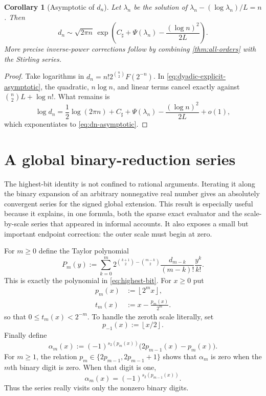 \documentclass[11pt]{article}
\numberwithin{equation}{section}
\newtheorem{corollary}[theorem]{Corollary}
\theoremstyle{definition}
\theoremstyle{remark}
\newcommand{\floor}[1]{\left\lfloor#1\right\rfloor}
\begin{document}
\begin{corollary}[Asymptotic of $d_n$]\label{cor:dn-asymptotic}
Let $\lambda_n$ be the solution of
$\lambda_n-(\log\lambda_n)/L=n$.  Then
\begin{equation}\label{eq:dn-asymptotic}
 d_n\sim\sqrt{2\pi n}\,
 \exp\!\left(
 C_\sharp+\Psi(\lambda_n)-\frac{(\log n)^2}{2L}
 \right).
\end{equation}
More precise inverse-power corrections follow by combining
\cref{thm:all-orders} with the Stirling series.
\end{corollary}

\begin{proof}
Take logarithms in
$d_n=n!2^{\binom n2}F(2^{-n})$.  In
\eqref{eq:dyadic-explicit-asymptotic}, the quadratic, $n\log n$, and linear
terms cancel exactly against $\binom n2L+\log n!$.  What remains is
\[
 \log d_n=\frac12\log(2\pi n)+C_\sharp+\Psi(\lambda_n)
 -\frac{(\log n)^2}{2L}+o(1),
\]
which exponentiates to \eqref{eq:dn-asymptotic}.
\end{proof}


\section{A global binary-reduction series}\label{sec:binary-series}

The highest-bit identity is not confined to rational arguments.  Iterating it
along the binary expansion of an arbitrary nonnegative real number gives an
absolutely convergent series for the signed global extension.  This result is
especially useful because it explains, in one formula, both the sparse exact
evaluator and the scale-by-scale series that appeared in informal accounts.
It also exposes a small but important endpoint correction: the outer scale
must begin at zero.

For $m\ge0$ define the Taylor polynomial
\begin{equation}\label{eq:reduction-polynomial}
 P_m(y):=
 \sum_{k=0}^{m}
 2^{\binom{k+1}{2}-\binom{m-k}{2}}
 \frac{d_{m-k}}{(m-k)!}\frac{y^k}{k!}.
\end{equation}
This is exactly the polynomial in \eqref{eq:highest-bit}.  For $x\ge0$ put
\begin{align}
 p_m(x)&:=\floor{2^m x},\label{eq:binary-prefix}\\
 t_m(x)&:=x-\frac{p_m(x)}{2^m}.\label{eq:binary-tail}
\end{align}
so that $0\le t_m(x)<2^{-m}$.  To handle the zeroth scale literally, set
\begin{equation}\label{eq:previous-prefix}
 p_{-1}(x):=\floor{x/2}.
\end{equation}
Finally define
\begin{equation}\label{eq:binary-series-coefficient}
 \alpha_m(x):=(-1)^{s_2(p_m(x))}
 \bigl(2p_{m-1}(x)-p_m(x)\bigr).
\end{equation}
For $m\ge1$, the relation
$p_m\in\{2p_{m-1},2p_{m-1}+1\}$ shows that $\alpha_m$ is zero when the
$m$th binary digit is zero.  When that digit is one,
\begin{equation}\label{eq:alpha-one-bit}
 \alpha_m(x)=(-1)^{s_2(p_{m-1}(x))}.
\end{equation}
Thus the series really visits only the nonzero binary digits.
\end{document}
